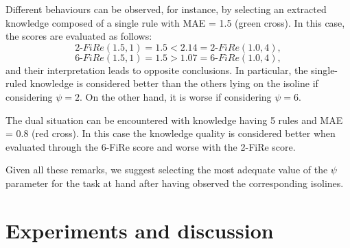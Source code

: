 \documentclass{article}
\newcommand{\fire}{FiRe}
\begin{document}
Different behaviours can be observed, for instance, by selecting an extracted knowledge composed of a single rule with MAE = 1.5 (green cross).
%
In this case, the scores are evaluated as follows:
%
\begin{equation*}
	2\textrm{-}\fire(1.5, 1)=1.5 < 2.14 = 2\textrm{-}\fire(1.0, 4),
\end{equation*}
%
\begin{equation*}
	6\textrm{-}\fire(1.5, 1)=1.5 > 1.07 = 6\textrm{-}\fire(1.0, 4),
\end{equation*}
%
and their interpretation leads to opposite conclusions.
%
In particular, the single-ruled knowledge is considered better than the others lying on the isoline if considering $\psi=2$.
%
On the other hand, it is worse if considering $\psi=6$.

The dual situation can be encountered with knowledge having 5 rules and MAE = 0.8 (red cross).
%
In this case the knowledge quality is considered better when evaluated through the 6-\fire{} score and worse with the 2-\fire{} score.

Given all these remarks, we suggest selecting the most adequate value of the $\psi$ parameter for the task at hand after having observed the corresponding isolines.

\section{Experiments and discussion}\label{sec:experiments}
\end{document}
